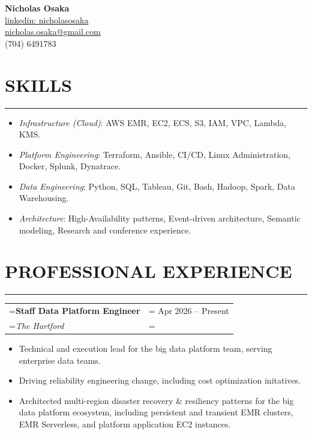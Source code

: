 \documentclass{article}
\def\name{Nicholas Osaka}
\def\lastname{Osaka}
\begin{document}
\pagestyle{fancy}
\fancyhead{}
\fancyfoot{}
\fancyfoot[C]{\lastname}
\vspace*{-.75cm}
\Large{\textbf{\name}}\\
\normalsize
\href{https://linkedin.com/in/nicholasosaka}{linkedin: nicholasosaka}\\
\href{mailto:nicholas.osaka@gmail.com}{nicholas.osaka@gmail.com}\\
(704) 649\textendash{}1783


\section*{\normalsize{SKILLS}}
\vspace{-1.8em}
\noindent\rule{\textwidth}{.5pt}
\begin{itemize}[label={}, leftmargin=1em]
    \setlength\itemsep{0em}
    \item \textit{Infrastructure (Cloud)}: AWS EMR, EC2, ECS, S3, IAM, VPC, Lambda, KMS.
    \item \textit{Platform Engineering}: Terraform, Ansible, CI/CD, Linux Administration, Docker, Splunk, Dynatrace.
    \item \textit{Data Engineering}: Python, SQL, Tableau, Git, Bash, Hadoop, Spark, Data Warehousing.
    \item \textit{Architecture}: High-Availability patterns, Event-driven architecture, Semantic modeling, Research and conference experience.
\end{itemize}

\section*{\normalsize{PROFESSIONAL EXPERIENCE}}
\vspace{-1.8em}
\noindent\rule{\textwidth}{.5pt}

\vspace{.5em}

\begin{tabularx}{\textwidth}{
    >{\raggedright\arraybackslash\hsize=1\hsize\linewidth=\hsize}X
    >{\raggedleft\arraybackslash\hsize=1\hsize\linewidth=\hsize}X }
    \textbf{Staff Data Platform Engineer} & Apr 2026 -- Present\\
    \textit{The Hartford} & \\
\end{tabularx}
\vspace{-.5em}
\begin{itemize}[label={•}, leftmargin=1em]
    \setlength\itemsep{0em}
    \item Technical and execution lead for the big data platform team, serving enterprise data teams.
    \item Driving reliability engineering change, including cost optimization initatives.
    \item Architected multi-region disaster recovery \& resiliency patterns for the big data platform ecosystem, including persistent and transient EMR clusters, EMR Serverless, and platform application EC2 instances.
\end{itemize}
\end{document}
